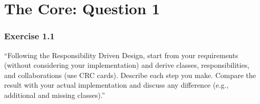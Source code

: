 \chapter{The Core: Question 1}

\subsection{Exercise 1.1}

``Following the Responsibility Driven Design, start from your requirements (without considering your implementation) and derive classes, responsibilities, and collaborations (use CRC cards). Describe each step you make. Compare the result with your actual implementation and discuss any difference (e.g., additional and missing classes).'' \\

